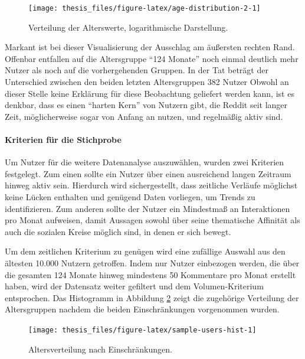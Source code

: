 \documentclass[11pt,a4paper,twoside]{article}
\let\oldpar\paragraph
\renewcommand{\paragraph}{\oldpar*}
\begin{document}
\begin{figure}

{\centering \texttt{[image: thesis\_files/figure-latex/age-distribution-2-1]} 

}

\caption{Verteilung der Alterswerte, logarithmische Darstellung.}\label{fig:age-distribution-2}
\end{figure}

Markant ist bei dieser Visualisierung der Ausschlag am äußersten rechten
Rand. Offenbar entfallen auf die Altersgruppe \enquote{124 Monate} noch
einmal deutlich mehr Nutzer als noch auf die vorhergehenden Gruppen. In
der Tat beträgt der Unterschied zwischen den beiden letzten
Altersgruppen 382 Nutzer Obwohl an dieser Stelle keine Erklärung für
diese Beobachtung geliefert werden kann, ist es denkbar, dass es einen
\enquote{harten Kern} von Nutzern gibt, die Reddit seit langer Zeit,
möglicherweise sogar von Anfang an nutzen, und regelmäßig aktiv sind.

\hypertarget{kriterien}{%
\paragraph{Kriterien für die Stichprobe}\label{kriterien}}

Um Nutzer für die weitere Datenanalyse auszuwählen, wurden zwei
Kriterien festgelegt. Zum einen sollte ein Nutzer über einen ausreichend
langen Zeitraum hinweg aktiv sein. Hierdurch wird sichergestellt, dass
zeitliche Verläufe möglichst keine Lücken enthalten und genügend Daten
vorliegen, um Trends zu identifizieren. Zum anderen sollte der Nutzer
ein Mindestmaß an Interaktionen pro Monat aufweisen, damit Aussagen
sowohl über seine thematische Affinität als auch die sozialen Kreise
möglich sind, in denen er sich bewegt.

Um dem zeitlichen Kriterium zu genügen wird eine zufällige Auswahl aus
den ältesten 10.000 Nutzern getroffen. Indem nur Nutzer einbezogen
werden, die über die gesamten 124 Monate hinweg mindestens 50 Kommentare
pro Monat erstellt haben, wird der Datensatz weiter gefiltert und dem
Volumen-Kriterium entsprochen. Das Histogramm in Abbildung
\ref{fig:sample-users-hist} zeigt die zugehörige Verteilung der
Altersgruppen nachdem die beiden Einschränkungen vorgenommen wurden.

\begin{figure}

{\centering \texttt{[image: thesis\_files/figure-latex/sample-users-hist-1]} 

}

\caption{Altersverteilung nach Einschränkungen.}\label{fig:sample-users-hist}
\end{figure}
\end{document}
